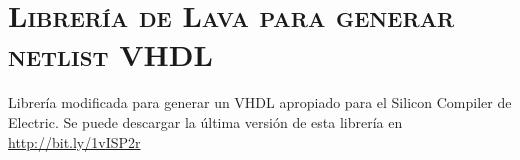 \chapter{\textsc{ Librería de Lava para generar netlist VHDL}}\label{chap:vhdlnew-lava}
Librería modificada para generar un  VHDL apropiado para el Silicon Compiler de Electric. Se puede descargar la última versión de esta librería en \url{http://bit.ly/1vISP2r}

\lstset{language=Haskell,breaklines=true,extendedchars=true,mathescape=false} 

















